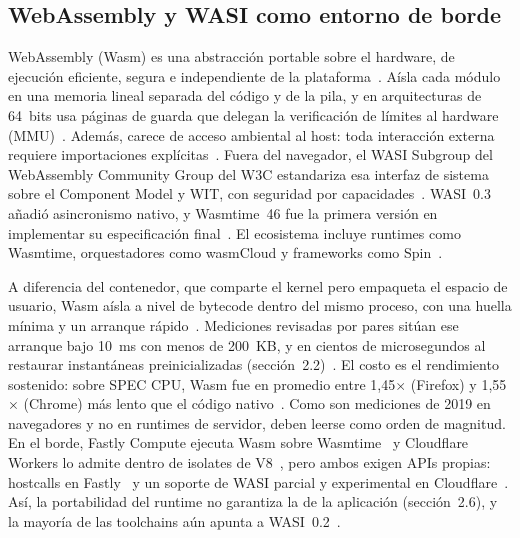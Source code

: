 \documentclass[12pt, letterpaper, table, xcdraw]{inf-pucv}
\begin{document}
\subsection{WebAssembly y WASI como entorno de borde}
\label{sec:wasm_wasi}

WebAssembly (Wasm) es una abstracción portable sobre el hardware, de ejecución eficiente, segura e independiente de la plataforma~\cite{haas2017bringing, w3c2026wasmcore}. Aísla cada módulo en una memoria lineal separada del código y de la pila, y en arquitecturas de 64~bits usa páginas de guarda que delegan la verificación de límites al hardware (MMU)~\cite{haas2017bringing}. Además, carece de acceso ambiental al host: toda interacción externa requiere importaciones explícitas~\cite{w3c2026wasmcore}. Fuera del navegador, el WASI Subgroup del WebAssembly Community Group del W3C estandariza esa interfaz de sistema sobre el Component Model y WIT, con seguridad por capacidades~\cite{wasi2026releases, gohman2024wasi, wasi2024p2}. WASI~0.3 añadió asincronismo nativo, y Wasmtime~46 fue la primera versión en implementar su especificación final~\cite{wasi2026releases, wasi2026p3}. El ecosistema incluye runtimes como Wasmtime, orquestadores como wasmCloud y frameworks como Spin~\cite{cncfwasmcloud, spinframework}.

A diferencia del contenedor, que comparte el kernel pero empaqueta el espacio de usuario, Wasm aísla a nivel de bytecode dentro del mismo proceso, con una huella mínima y un arranque rápido~\cite{haas2017bringing, kjorveziroski2021iot}. Mediciones revisadas por pares sitúan ese arranque bajo 10~ms con menos de 200~KB, y en cientos de microsegundos al restaurar instantáneas preinicializadas (sección~2.2)~\cite{shillaker2020faasm}. El costo es el rendimiento sostenido: sobre SPEC CPU, Wasm fue en promedio entre 1{,}45$\times$ (Firefox) y 1{,}55$\times$ (Chrome) más lento que el código nativo~\cite{jangda2019notsofast}. Como son mediciones de 2019 en navegadores y no en runtimes de servidor, deben leerse como orden de magnitud. En el borde, Fastly Compute ejecuta Wasm sobre Wasmtime~\cite{fastlycomputeintro} y Cloudflare Workers lo admite dentro de isolates de V8~\cite{cloudflarehowworkersworks}, pero ambos exigen APIs propias: hostcalls en Fastly~\cite{fastlycomputesdks} y un soporte de WASI parcial y experimental en Cloudflare~\cite{cloudflare2026wasm}. Así, la portabilidad del runtime no garantiza la de la aplicación (sección~2.6), y la mayoría de las toolchains aún apunta a WASI~0.2~\cite{wasi2026releases}.
\end{document}
